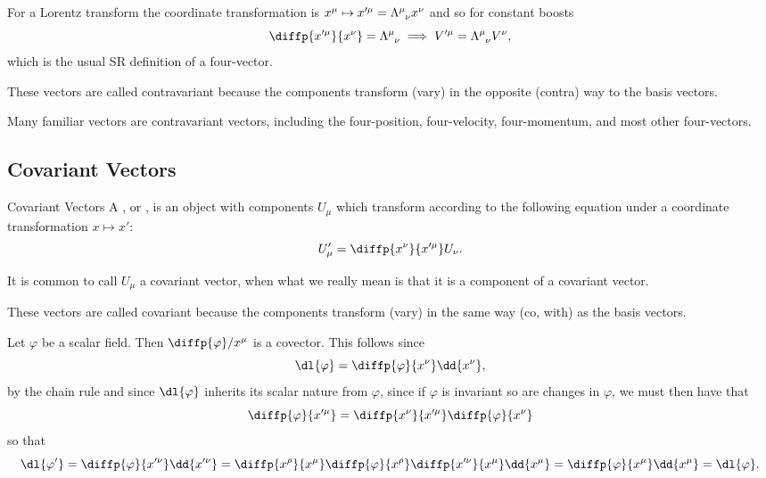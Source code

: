 \documentclass[fleqn]{NotesClass}
\begin{document}
    For a Lorentz transform the coordinate transformation is \(x^\mu \mapsto x'^\mu = \tensor{\Lambda}{^\mu_\nu}x^\nu\) and so for constant boosts
    \begin{equation}
        \diffp{x'^\mu}{x^\nu} = \tensor{\Lambda}{^\mu_\nu} \implies V'^\mu = \tensor{\Lambda}{^\mu_\nu} V^\nu,
    \end{equation}
    which is the usual SR definition of a four-vector.
    
    These vectors are called contravariant because the components transform (vary) in the opposite (contra) way to the basis vectors.
    
    Many familiar vectors are contravariant vectors, including the four-position, four-velocity, four-momentum, and most other four-vectors.
    
    \subsection{Covariant Vectors}
    \begin{dfn}{Covariant Vectors}{}
        A , or , is an object with components \(U_\mu\) which transform according to the following equation under a coordinate transformation \(x \mapsto x'\):
        \begin{equation}
            U'_\mu = \diffp{x^\nu}{x'^\mu}U_\nu.
        \end{equation}
    \end{dfn}
    
    It is common to call \(U_\mu\) a covariant vector, when what we really mean is that it is a component of a covariant vector.
    
    These vectors are called covariant because the components transform (vary) in the same way (co, with) as the basis vectors.
    
    \begin{exm}{}{}
        Let \(\varphi\) be a scalar field.
        Then \(\diffp{\varphi}/{x^\mu}\) is a covector.
        This follows since
        \begin{equation}
            \dl{\varphi} = \diffp{\varphi}{x^\nu}\dd{x^\nu},
        \end{equation}
        by the chain rule and since \(\dl{\varphi}\) inherits its scalar nature from \(\varphi\), since if \(\varphi\) is invariant so are changes in \(\varphi\), we must then have that
        \begin{equation}
            \diffp{\varphi}{x'^\mu} = \diffp{x^\nu}{x'^\mu} \diffp{\varphi}{x^\nu}
        \end{equation}
        so that
        \begin{equation}
            \dl{\varphi'} = \diffp{\varphi}{x'^\nu}\dd{x'^\nu} = \diffp{x^\rho}{x^\mu} \diffp{\varphi}{x^\rho} \diffp{x'^\nu}{x^\mu} \dd{x^\mu} = \diffp{\varphi}{x^\mu}\dd{x^\mu} = \dl{\varphi}.
        \end{equation}
    \end{exm}
    
\end{document}

